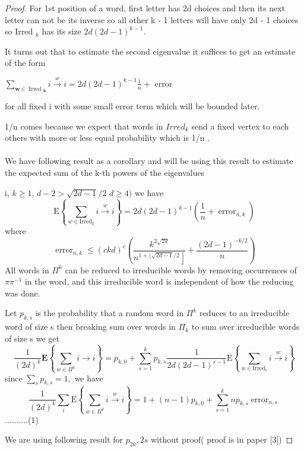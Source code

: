 \documentclass[oneside]{book}
\begin{document}
\begin{proof}
 For 1st position of a word, first letter has  2d choices and then its next letter can not be its inverse so all other k - 1 letters will have only 2d - 1 choices so
  Irred $_{k}$ has its  size $2 d(2 d-1)^{k-1} .$ \par 
  It turns out that to estimate the second eigenvalue it suffices
to get an estimate of the form
\begin{center}
   $\sum_{\boldsymbol{w} \in \text { Irred }_{\boldsymbol{k}}} i \stackrel{w}{\rightarrow} i=2 d(2 d-1)^{k-1} \frac{1}{n}+$ error 
\end{center}
for all fixed i with some small error term which will be bounded later.\par
 1/n comes because we expect  that words in $Irred_{k} $ send a fixed vertex to each  others with more or less equal probability which is 1/n . \\\\
We have following result as a corollary and will be using this result to estimate the expected sum of the k-th powers of the eigenvalues \par
  i, $k \geq 1$,  $d-2>\sqrt{2 d-1} / 2$  $d \geq 4)$ we have
$$
\mathrm{E}\left\{\sum_{w \in \mathrm{Irred}_{k}} i \stackrel{w}{\rightarrow} i\right\}=2 d(2 d-1)^{k-1}\left(\frac{1}{n}+\operatorname{error}_{n, k}\right)
$$
where
$$
\operatorname{error}_{n, k} \leq(c k d)^{c}\left(\frac{k^{2 \sqrt{2 d}}}{\left.n^{1+\lfloor\sqrt{2 d-1} / 2}\right\rfloor}+\frac{(2 d-1)^{-k / 2}}{n}\right)
$$
All words in $\Pi^{k}$ can be reduced to irreducible words by removing occurrences of $\pi \pi^{-1}$ in the word, and this irreducible word is independent of how the reducing was done. \par 
Let  $p_{k,s}$ is the probability that a random word in  $\Pi^{k}$ reduces to an irreducible word of size s then breaking sum over words in  $\Pi_k$ to sum over irreducible words of size s  we get  
$$
\frac{1}{(2 d)^{k}} \mathbf{E}\left\{\sum_{w \in \Pi^{k}} i\rightarrow i\right\}=p_{k, 0}+\sum_{s=1}^{k} p_{k, s} \frac{1}{2 d(2 d-1)^{s-1}} \mathrm{E}\left\{\sum_{w \in \mathrm{Irred}_{s}} i \stackrel{w}{\rightarrow} i\right\}
$$
  since $\sum_{s} p_{k, s}=1,$ we have
$$ 
\frac{1}{(2 d)^{k}} \sum_{i} \mathrm{E}\left\{\sum_{w \in \Pi^{k}} i \stackrel{w}{\rightarrow} i\right\}=1+(n-1) p_{k, 0}+\sum_{s=1}^{k} n p_{k, s} \operatorname{error}_{n, s} 
$$    ..........(1)\par
We are using following result for $p_{2k},{2s}$ without proof( proof is in paper [3])  \par

\end{proof}
\end{document}

